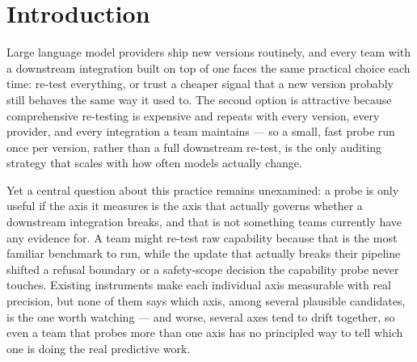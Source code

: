 \documentclass[11pt]{article}
\begin{document}
\section{Introduction}

Large language model providers ship new versions routinely, and every team with a downstream integration built on top of one faces the same practical choice each time: re-test everything, or trust a cheaper signal that a new version probably still behaves the same way it used to. The second option is attractive because comprehensive re-testing is expensive and repeats with every version, every provider, and every integration a team maintains --- so a small, fast probe run once per version, rather than a full downstream re-test, is the only auditing strategy that scales with how often models actually change.

Yet a central question about this practice remains unexamined: a probe is only useful if the axis it measures is the axis that actually governs whether a downstream integration breaks, and that is not something teams currently have any evidence for. A team might re-test raw capability because that is the most familiar benchmark to run, while the update that actually breaks their pipeline shifted a refusal boundary or a safety-scope decision the capability probe never touches. Existing instruments make each individual axis measurable with real precision, but none of them says which axis, among several plausible candidates, is the one worth watching --- and worse, several axes tend to drift together, so even a team that probes more than one axis has no principled way to tell which one is doing the real predictive work.
\end{document}
